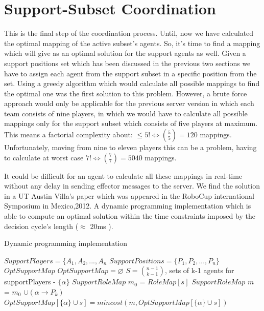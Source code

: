 \section{Support-Subset Coordination}
This is the final step of the coordination process. Until, now we have calculated the optimal mapping of the active subset's agents. So, it's time to find a mapping which will give as an optimal solution for the support agents as well. Given a support positions set which has been discussed in the previous two sections we have to assign each agent from the support subset in a specific position from the set. Using a greedy algorithm which would calculate all possible mappings to find the optimal one was the first solution to this problem. However, a brute force approach would only be applicable for the previous server version in which each team consists of nine players, in which we would have to calculate all possible mappings only for the support subset which consists of five players at maximum. 
This means a factorial complexity about: $\leqslant 5! \Leftrightarrow  {{5}\choose{5}} = 120$ mappings. Unfortunately, moving from nine to eleven  players this can be a problem, having to calculate at worst case $ 7! \Leftrightarrow  {{7}\choose{7}} = 5040$ mappings. 

It could be difficult for an agent to calculate all these mappings in real-time without any delay in sending effector messages to the server. We find the solution in a UT Austin Villa's paper \cite{UtAustinVillaPaper} which was appeared in the RoboCup international Symposium in Mexico,2012. A dynamic programming implementation which is able to compute an optimal solution within the time constraints imposed by the decision cycle's length ($\approx$ 20ms ).
\begin{algorithm}[htb!]
\caption{Dynamic programming implementation \cite{UtAustinVillaPaper}}
\label{alg3}
\begin{algorithmic}[1]
$SupportPlayers = \lbrace A_{1},A_{2},...,A_{n} $
\STATE $SupportPositions = \lbrace P_{1},P_{2},...,P_{n} \rbrace $
$OptSupportMap$
\STATE $OptSupportMap = \varnothing $
\STATE $ S = {{n-1}\choose{k-1}} $, sets of k-1 agents for supportPlayers - $\lbrace \alpha \rbrace$
\STATE $SupportRoleMap$ $m_{0}$ = $RoleMap[s]$
\STATE $SupportRoleMap$ $m$ = $m_{0}$ $ \cup (\alpha \rightarrow P_{k})$
\STATE $OptSupportMap[\lbrace \alpha \rbrace \cup s] = mincost(m,OptSupportMap[\lbrace \alpha \rbrace \cup s])$
\ENDFOR
\ENDFOR
\ENDFOR
\end{algorithmic}
\end{algorithm}

